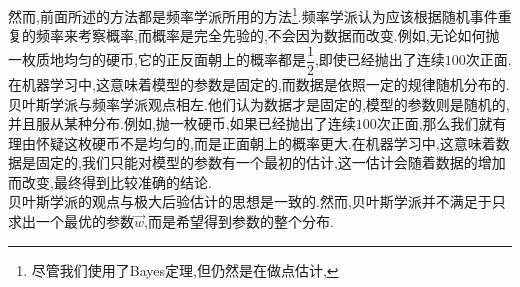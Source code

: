 \documentclass{ctexart}
\begin{document}
然而,前面所述的方法都是频率学派所用的方法\footnote{尽管我们使用了Bayes定理,但仍然是在做点估计,}.频率学派认为应该根据随机事件重复的频率来考察概率,而概率是完全先验的,不会因为数据而改变.例如,无论如何抛一枚质地均匀的硬币,它的正反面朝上的概率都是$\dfrac12$,即使已经抛出了连续$100$次正面.在机器学习中,这意味着模型的参数是固定的,而数据是依照一定的规律随机分布的.\\
\indent 贝叶斯学派与频率学派观点相左.他们认为数据才是固定的,模型的参数则是随机的,并且服从某种分布.例如,抛一枚硬币,如果已经抛出了连续$100$次正面,那么我们就有理由怀疑这枚硬币不是均匀的,而是正面朝上的概率更大.在机器学习中,这意味着数据是固定的,我们只能对模型的参数有一个最初的估计,这一估计会随着数据的增加而改变,最终得到比较准确的结论.\\
\indent 贝叶斯学派的观点与极大后验估计的思想是一致的.然而,贝叶斯学派并不满足于只求出一个最优的参数$\vec{w}$,而是希望得到参数的整个分布.
\end{document}
